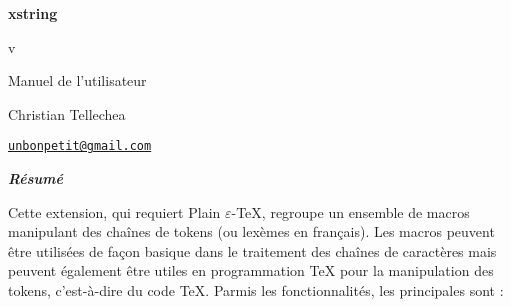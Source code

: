 \documentclass[a4paper,10pt]{article}
\newcommand\Xstring{\textsf{xstring}\xspace}
\begin{document}
\setlength{\parindent}{0pt}
\begin{titlepage}
	\null\par\vfill
	\begin{center}
		\begin{minipage}{0.75\linewidth}
			\begin{center}
				\Huge\bfseries \Xstring\par\vspace{5pt}
				\small v\xstringversion\par\vspace{25pt}
				\normalsize Manuel de l'utilisateur
			\end{center}
		\end{minipage}
	\end{center}
	\vspace{1cm}
	\begin{center}
		Christian {\sc Tellechea}\par\small
		\href{mailto:unbonpetit@gmail.com}{\nolinkurl{unbonpetit@gmail.com}}\par\vspace{5pt}
		\xstringfrenchdate
	\end{center}
	\vfill\hrulefill
	\begin{center}
		\begin{minipage}{0.85\linewidth}
			\noindent
			\hfill\textbf{\textit{Résumé}}\hfill{}\medskip\par
			Cette extension, qui requiert Plain $\varepsilon$-\TeX, regroupe un ensemble de macros manipulant des chaînes de tokens (ou lexèmes en français). Les macros peuvent être utilisées de façon basique dans le traitement des chaînes de caractères mais peuvent également être utiles en programmation \TeX{} pour la manipulation des tokens, c'est-à-dire du code \TeX{}. Parmis les fonctionnalités, les principales sont :\smallskip


\end{minipage}
\end{center}
\end{titlepage}
\end{document}

